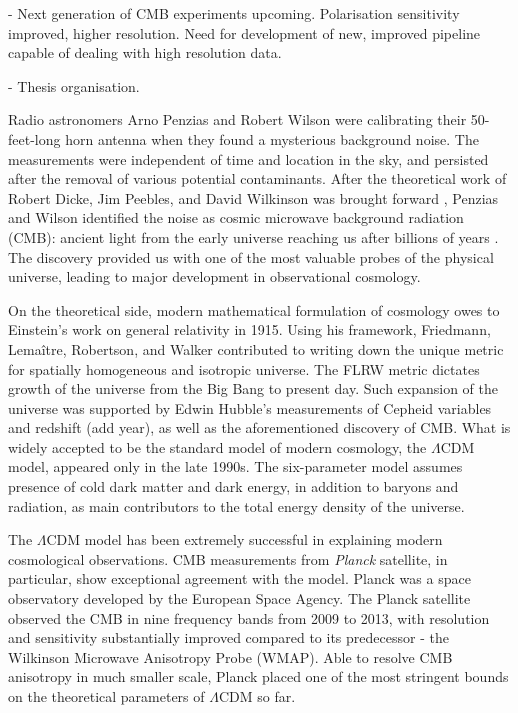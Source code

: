 - Next generation of CMB experiments upcoming. Polarisation sensitivity improved, higher resolution. Need for development of new, improved pipeline capable of dealing with high resolution data.

- Thesis organisation.

Radio astronomers Arno Penzias and Robert Wilson were calibrating their 50-feet-long horn antenna when they found a mysterious background noise. The measurements were independent of time and location in the sky, and persisted after the removal of various potential contaminants. After the theoretical work of Robert Dicke, Jim Peebles, and David Wilkinson was brought forward \cite{Dicke1965}, Penzias and Wilson identified the noise as cosmic microwave background radiation (CMB): ancient light from the early universe reaching us after billions of years \cite{Penzias1965}. The discovery provided us with one of the most valuable probes of the physical universe, leading to major development in observational cosmology.

On the theoretical side, modern mathematical formulation of cosmology owes to Einstein's work on general relativity in 1915. Using his framework, Friedmann, Lemaître, Robertson, and Walker contributed to writing down the unique metric for spatially homogeneous and isotropic universe. The FLRW metric dictates growth of the universe from the Big Bang to present day. Such expansion of the universe was supported by Edwin Hubble's measurements of Cepheid variables and redshift (add year), as well as the aforementioned discovery of CMB. What is widely accepted to be the standard model of modern cosmology, the $\Lambda$CDM model, appeared only in the late 1990s. The six-parameter model assumes presence of cold dark matter and dark energy, in addition to baryons and radiation, as main contributors to the total energy density of the universe.

The $\Lambda$CDM model has been extremely successful in explaining modern cosmological observations. CMB measurements from \textit{Planck} satellite, in particular, show exceptional agreement with the model. Planck was a space observatory developed by the European Space Agency. The Planck satellite observed the CMB in nine frequency bands from 2009 to 2013, with resolution and sensitivity substantially improved compared to its predecessor - the Wilkinson Microwave Anisotropy Probe (WMAP). Able to resolve CMB anisotropy in much smaller scale, Planck placed one of the most stringent bounds on the theoretical parameters of $\Lambda$CDM so far.

